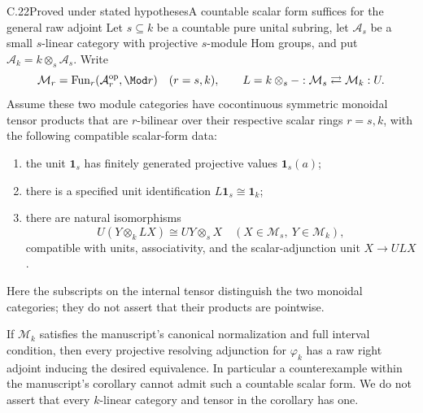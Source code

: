 \begin{claim}{C.22}{Proved under stated hypotheses}{A countable scalar form suffices for the general raw adjoint}\label{C22}
Let $s\subseteq k$ be a countable pure unital subring, let $\mathcal A_s$ be a small $s$-linear category with projective $s$-module Hom groups, and put $\mathcal A_k=k\otimes_s\mathcal A_s$. Write
\[
 \mathcal M_r=\operatorname{Fun}_{r}(\mathcal A_r^{\mathrm{op}},\Mod r)
 \quad(r=s,k),
 \qquad L=k\otimes_s-:\mathcal M_s\rightleftarrows\mathcal M_k:U.
\]
Assume these two module categories have cocontinuous symmetric monoidal tensor products that are $r$-bilinear over their respective scalar rings $r=s,k$, with the following compatible scalar-form data:
\begin{enumerate}
\item the unit $\mathbf1_s$ has finitely generated projective values $\mathbf1_s(a)$;
\item there is a specified unit identification $L\mathbf1_s\cong\mathbf1_k$;
\item there are natural isomorphisms
\[
 U(Y\otimes_k LX)\cong UY\otimes_sX
 \quad(X\in\mathcal M_s,\ Y\in\mathcal M_k),
\]
compatible with units, associativity, and the scalar-adjunction unit $X\to ULX$.
\end{enumerate}
Here the subscripts on the internal tensor distinguish the two monoidal categories; they do not assert that their products are pointwise.

If $\mathcal M_k$ satisfies the manuscript's canonical normalization and full interval condition, then every projective resolving adjunction for $\varphi_k$ has a raw right adjoint inducing the desired equivalence. In particular a counterexample within the manuscript's corollary cannot admit such a countable scalar form. We do not assert that every $k$-linear category and tensor in the corollary has one.
\end{claim}
